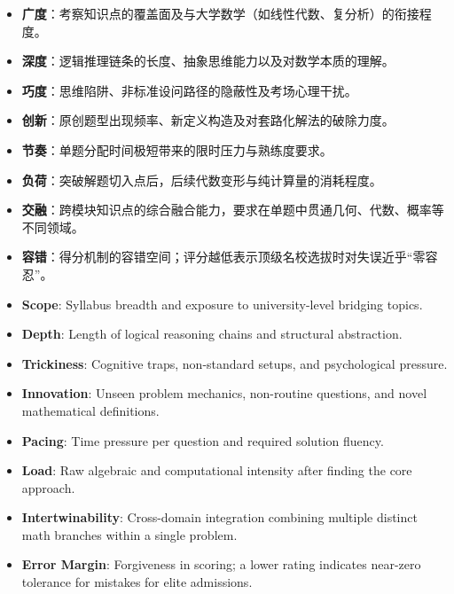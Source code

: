 \begin{itemize}
    \item \textbf{广度}：考察知识点的覆盖面及与大学数学（如线性代数、复分析）的衔接程度。
    \item \textbf{深度}：逻辑推理链条的长度、抽象思维能力以及对数学本质的理解。
    \item \textbf{巧度}：思维陷阱、非标准设问路径的隐蔽性及考场心理干扰。
    \item \textbf{创新}：原创题型出现频率、新定义构造及对套路化解法的破除力度。
    \item \textbf{节奏}：单题分配时间极短带来的限时压力与熟练度要求。
    \item \textbf{负荷}：突破解题切入点后，后续代数变形与纯计算量的消耗程度。
    \item \textbf{交融}：跨模块知识点的综合融合能力，要求在单题中贯通几何、代数、概率等不同领域。
    \item \textbf{容错}：得分机制的容错空间；评分越低表示顶级名校选拔时对失误近乎“零容忍”。
\end{itemize}

\begin{itemize}
    \item \textbf{Scope}: Syllabus breadth and exposure to university-level bridging topics.
    \item \textbf{Depth}: Length of logical reasoning chains and structural abstraction.
    \item \textbf{Trickiness}: Cognitive traps, non-standard setups, and psychological pressure.
    \item \textbf{Innovation}: Unseen problem mechanics, non-routine questions, and novel mathematical definitions.
    \item \textbf{Pacing}: Time pressure per question and required solution fluency.
    \item \textbf{Load}: Raw algebraic and computational intensity after finding the core approach.
    \item \textbf{Intertwinability}: Cross-domain integration combining multiple distinct math branches within a single problem.
    \item \textbf{Error Margin}: Forgiveness in scoring; a lower rating indicates near-zero tolerance for mistakes for elite admissions.
\end{itemize}

\centering

\vspace{1cm}

